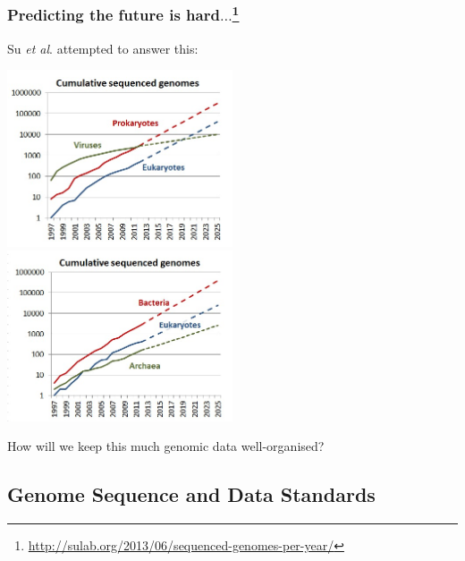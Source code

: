 \begin{frame}
  \frametitle{Predicting the future is hard$\ldots$\footnote{\tiny{\href{http://sulab.org/2013/06/sequenced-genomes-per-year/}{http://sulab.org/2013/06/sequenced-genomes-per-year/}}}}
    Su \textit{et al}. attempted to answer this:
    \begin{center}
      \includegraphics[width=0.5\textwidth]{images/cumulative_sequenced_genomes1}
      \includegraphics[width=0.5\textwidth]{images/cumulative_sequenced_genomes2}
    \end{center}     
    How will we keep this much genomic data well-organised?
\end{frame}

\subsection{Genome Sequence and Data Standards}


